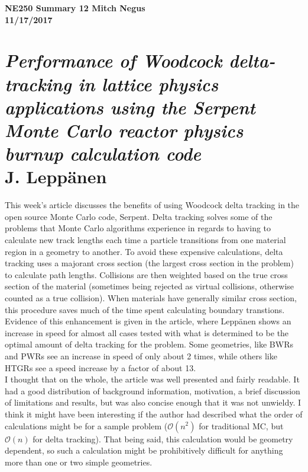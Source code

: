 \documentclass{report}
\newcommand{\tab}{\-\hspace{1cm}}
\begin{document}
\thispagestyle{empty}

{\bf {\large {NE250 Summary 12} \hfill Mitch Negus\\
		\hspace*{\fill} 11/17/2017\\ }}
\section*{\textsl{Performance of Woodcock delta-tracking in lattice physics applications using the Serpent Monte Carlo reactor physics burnup calculation code} \\ \normalsize J. Lepp\"{a}nen}

\tab This week's article discusses the benefits of using Woodcock delta tracking in the open source Monte Carlo code, Serpent. Delta tracking solves some of the problems that Monte Carlo algorithms experience in regards to having to calculate new track lengths each time a particle transitions from one material region in a geometry to another. To avoid these expensive calculations, delta tracking uses a majorant cross section (the largest cross section in the problem) to calculate path lengths. Collisions are then weighted  based on the true cross section of the material (sometimes being rejected as virtual collisions, otherwise counted as a true collision). When materials have generally similar cross section, this procedure saves much of the time spent calculating boundary transtions. Evidence of this enhancement is given in the article, where Lepp\"{a}nen shows an increase in speed for almost all cases tested with what is determined to be the optimal amount of delta tracking for the problem. Some geometries, like BWRs and PWRs see an increase in speed of only about 2 times, while others like HTGRs see a speed increase by a factor of about 13.\\
\tab I thought that on the whole, the article was well presented and fairly readable. It had a good distribution of background information, motivation, a brief discussion of limitations and results, but was also concise enough that it was not unwieldy. I think it might have been interesting if the author had described what the order of calculations might be for a sample problem ($\mathcal{O}(n^2)$ for traditional MC, but $\mathcal{O}(n)$ for delta tracking). That being said, this calculation would be geometry dependent, so such a calculation might be prohibitively difficult for anything more than one or two simple geometries.
\end{document}
